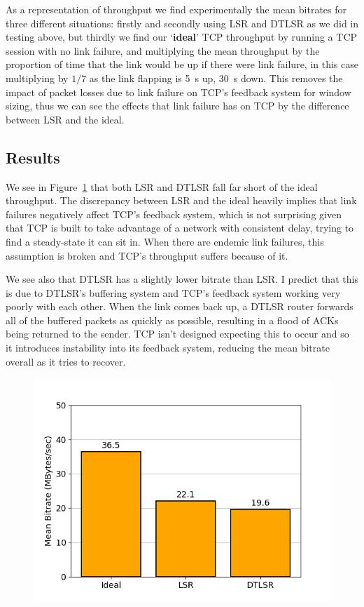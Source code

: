 \documentclass[withindex,glossary,openany]{cam-thesis}
\begin{document}
As a representation of throughput we find experimentally the mean bitrates for three different situations: firstly and secondly using LSR and DTLSR as we did in testing above, but thirdly we find our `\textbf{ideal}' TCP throughput by running a TCP session with no link failure, and multiplying the mean throughput by the proportion of time that the link would be up if there were link failure, in this case multiplying by $1/7$ as the link flapping is \SI{5}{\s} up, \SI{30}{\s} down. This removes the impact of packet losses due to link failure on TCP's feedback system for window sizing, thus we can see the effects that link failure has on TCP by the difference between LSR and the ideal.

\subsection{Results}

We see in Figure~\ref{fig:tcp_5_30} that both LSR and DTLSR fall far short of the ideal throughput. The discrepancy between LSR and the ideal heavily implies that link failures negatively affect TCP's feedback system, which is not surprising given that TCP is built to take advantage of a network with consistent delay, trying to find a steady-state it can sit in. When there are endemic link failures, this assumption is broken and TCP's throughput suffers because of it.

We see also that DTLSR has a slightly lower bitrate than LSR. I predict that this is due to DTLSR's buffering system and TCP's feedback system working very poorly with each other. When the link comes back up, a DTLSR router forwards all of the buffered packets as quickly as possible, resulting in a flood of ACKs being returned to the sender. TCP isn't designed expecting this to occur and so it introduces instability into its feedback system, reducing the mean bitrate overall as it tries to recover.

\begin{figure}[H]
  \centering
  \includegraphics[width=0.8\linewidth]{tcp_bar_flap5_30}
  \caption{}
  \label{fig:tcp_5_30}
\end{figure}
\end{document}
